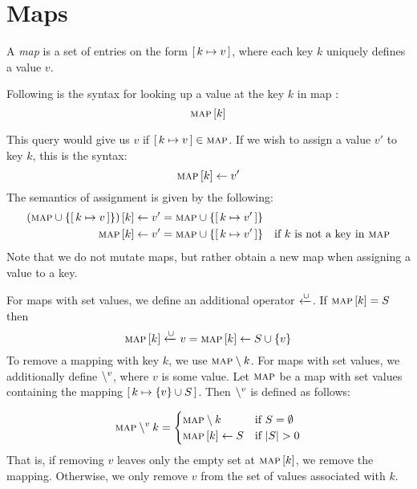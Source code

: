 \section{Maps}
\label{sec:maps}

\begin{definition}[Map]
  A \emph{map} is a set of entries on the form $[ \,k \mapsto v\, ]$, where each key $k$ uniquely defines a value $v$. 
  \label{def:map}
\end{definition}

Following is the syntax for looking up a value at the key $k$ in map :
\[
  \textsc{map} \left[ k \right]
\]

This query would give us $v$ if $[ \,k \mapsto v\, ] \in \textsc{map}$. If we wish to assign a value $v'$ to key $k$, this is the syntax:
\[
\textsc{map} \left[ k \right] \leftarrow v'
\]
The semantics of assignment is given by the following:
\begin{align*}
  \left(\textsc{map} \cup \left\{[ \,k \mapsto v\, ]\right\}\right) \left[ k \right] \leftarrow v' &= \textsc{map} \cup \left\{[ \,k \mapsto v'\, ]\right\} &&\\
  \textsc{map} \left[ k \right] \leftarrow v' &= \textsc{map} \cup \left\{[ \,k \mapsto v'\, ]\right\} && \text{if $k$ is not a key in \textsc{map}}
\end{align*}
Note that we do not mutate maps, but rather obtain a new map when assigning a value to a key. 

For maps with set values, we define an additional operator $\xleftarrow{\cup}$. If $\textsc{map} \left[ k \right] = S$ then 
\[\textsc{map} \left[ k \right] \xleftarrow{\cup} v = \textsc{map} \left[ k \right] \leftarrow S \cup \{v\}\]
To remove a mapping with key $k$, we use $\textsc{map} \setminus k$. For maps with set values, we additionally define $\setminus^{v}$, where $v$ is some value. Let $\textsc{map}$ be a map with set values containing the mapping $[ \,k \mapsto \{v\} \cup S\, ]$. Then $\setminus^{v}$ is defined as follows:

\[
  \textsc{map} \setminus^{v} k =
  \begin{cases}
    \textsc{map} \setminus k & \text{if } S = \emptyset\\
    \textsc{map} \left[ k \right] \leftarrow S & \text{if } |S| > 0
  \end{cases}
\]
That is, if removing $v$ leaves only the empty set at $\textsc{map} \left[ k \right]$, we remove the mapping. Otherwise, we only remove $v$ from the set of values associated with $k$. 

